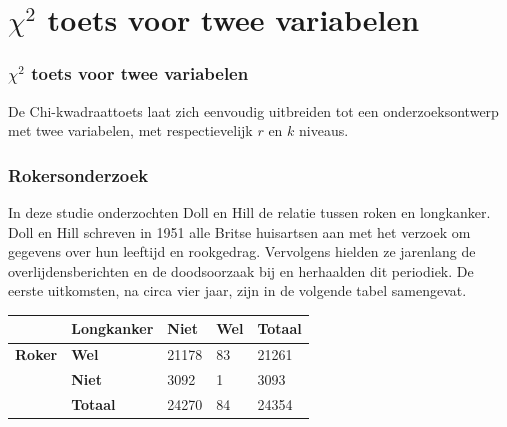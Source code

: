 \documentclass{beamer}
\begin{document}
\section{$\chi^{2}$ toets voor twee variabelen}
\sectionframelogo{}

\begin{frame}
  \frametitle{$\chi^{2}$ toets voor twee variabelen}
  De Chi-kwadraattoets  laat zich eenvoudig uitbreiden tot een onderzoeksontwerp met twee variabelen, met respectievelijk $r$ en $k$ niveaus.
\end{frame}

\begin{frame}
  \frametitle{Rokersonderzoek}
  In deze studie onderzochten Doll en Hill de relatie tussen roken en longkanker. Doll en Hill schreven in 1951 alle Britse huisartsen aan met het verzoek om gegevens over hun leeftijd en rookgedrag. Vervolgens hielden ze jarenlang de overlijdensberichten en de doodsoorzaak bij en herhaalden dit periodiek. De eerste uitkomsten, na circa vier jaar, zijn in de volgende tabel samengevat.

  \begin{table}[h]
    \begin{tabular}{@{}lllll@{}}
      \toprule
                     & \textbf{Longkanker} & \textbf{Niet} & \textbf{Wel} & \textbf{Totaal} \\ \midrule
      \textbf{Roker} & \textbf{Wel}        & 21178         & 83           & 21261           \\
                     & \textbf{Niet}       & 3092          & 1            & 3093            \\
                     & \textbf{Totaal}     & 24270         & 84           & 24354           \\ \bottomrule
    \end{tabular}
  \end{table}
\end{frame}
\end{document}
